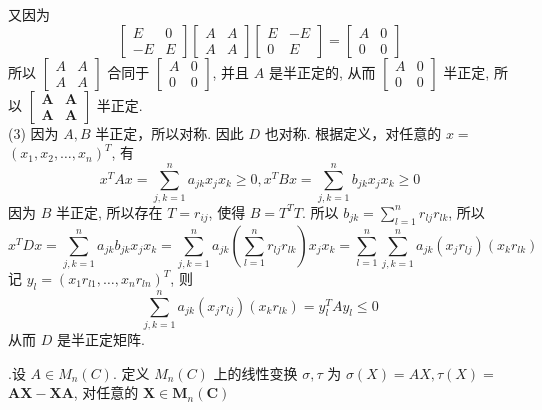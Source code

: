 \documentclass{article}
\begin{document}
\begin{enumerate}[\qquad 证明：]
$$          $$
          又因为
          $$
              \left[\begin{array}{cc}
                      E  & 0 \\
                      -E & E
                  \end{array}\right]\left[\begin{array}{ll}
                      A & A \\
                      A & A
                  \end{array}\right]\left[\begin{array}{cc}
                      E & -E \\
                      0 & E
                  \end{array}\right]=\left[\begin{array}{cc}
                      A & 0 \\
                      0 & 0
                  \end{array}\right]
          $$
          所以 $\left[\begin{array}{ll}A & A \\ A & A\end{array}\right]$ 合同于 $\left[\begin{array}{cc}A & 0 \\ 0 & 0\end{array}\right]$, 并且 $A$ 是半正定的, 从而 $\left[\begin{array}{cc}A & 0 \\ 0 & 0\end{array}\right]$ 半正定, 所以
          $\left[\begin{array}{ll}\boldsymbol{A} & \boldsymbol{A} \\ \boldsymbol{A} & \boldsymbol{A}\end{array}\right]$ 半正定. \\
          (3) 因为 $A, B$ 半正定，所以对称. 因此 $D$ 也对称. 根据定义，对任意的 $x=$
          $\left(x_{1}, x_{2}, \ldots, x_{n}\right)^{T}$, 有
          $$
              x^{T} A x=\sum_{j, k=1}^{n} a_{j k} x_{j} x_{k} \geq 0, x^{T} B x=\sum_{j, k=1}^{n} b_{j k} x_{j} x_{k} \geq 0
          $$
          因为 $B$ 半正定, 所以存在 $T=r_{i j}$, 使得 $B=T^{T} T .$ 所以 $b_{j k}=\sum_{l=1}^{n} r_{l j} r_{l k}$, 所以
          \begin{equation*}
              x^{T} D x=\sum_{j, k=1}^{n} a_{j k} b_{j k} x_{j} x_{k}=\sum_{j, k=1}^{n} a_{j k}\left(\sum_{l=1}^{n} r_{l j} r_{l k}\right) x_{j} x_{k}=
              \sum_{l=1}^{n} \sum_{j, k=1}^{n} a_{j k}\left(x_{j} r_{l j}\right)\left(x_{k} r_{l k}\right)
          \end{equation*}
          记 $y_{l}=\left(x_{1} r_{l 1}, \ldots, x_{n} r_{l n}\right)^{T}$, 则
          $$
              \sum_{j, k=1}^{n} a_{j k}\left(x_{j} r_{l j}\right)\left(x_{k} r_{l k}\right)=y_{l}^{T} A y_{l} \leq 0
          $$
          从而 $D$ 是半正定矩阵.
\end{enumerate}
\vspace{1ex}
{.}设 $A \in M_{n}(C)$. 定义 $M_{n}(C)$ 上的线性变换 $\sigma, \tau$ 为 $\sigma(X)=A X, \tau(X)=$ $\boldsymbol{A} \boldsymbol{X}-\boldsymbol{X} \boldsymbol{A}$, 对任意的 $\boldsymbol{X} \in \boldsymbol{M}_{n}(\boldsymbol{C})$
\end{document}
